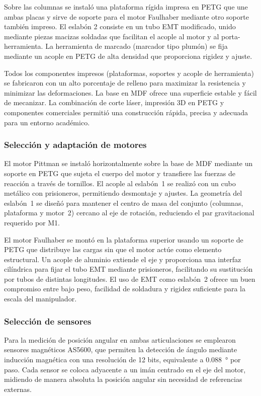 \documentclass[11pt,a4paper]{article}
\begin{document}
Sobre las columnas se instaló una plataforma rígida impresa en PETG que une ambas placas y sirve de soporte para el motor Faulhaber mediante otro soporte también impreso. El eslabón 2 consiste en un tubo EMT modificado, unido mediante piezas macizas soldadas que facilitan el acople al motor y al porta-herramienta. La herramienta de marcado (marcador tipo plumón) se fija mediante un acople en PETG de alta densidad que proporciona rigidez y ajuste.

Todos los componentes impresos (plataformas, soportes y acople de herramienta) se fabricaron con un alto porcentaje de relleno para maximizar la resistencia y minimizar las deformaciones. La base en MDF ofrece una superficie estable y fácil de mecanizar. La combinación de corte láser, impresión 3D en PETG y componentes comerciales permitió una construcción rápida, precisa y adecuada para un entorno académico.


\subsubsection{Selección y adaptación de motores}

El motor Pittman se instaló horizontalmente sobre la base de MDF mediante un soporte en PETG que sujeta el cuerpo del motor y transfiere las fuerzas de reacción a través de tornillos. El acople al eslabón~1 se realizó con un cubo metálico con prisioneros, permitiendo desmontaje y ajustes. La geometría del eslabón~1 se diseñó para mantener el centro de masa del conjunto (columnas, plataforma y motor~2) cercano al eje de rotación, reduciendo el par gravitacional requerido por M1.

El motor Faulhaber se montó en la plataforma superior usando un soporte de PETG que distribuye las cargas sin que el motor actúe como elemento estructural. Un acople de aluminio extiende el eje y proporciona una interfaz cilíndrica para fijar el tubo EMT mediante prisioneros, facilitando su sustitución por tubos de distintas longitudes. El uso de EMT como eslabón~2 ofrece un buen compromiso entre bajo peso, facilidad de soldadura y rigidez suficiente para la escala del manipulador.


\subsubsection{Selección de sensores}

Para la medición de posición angular en ambas articulaciones se emplearon sensores magnéticos AS5600, que permiten la detección de ángulo mediante inducción magnética con una resolución de 12 bits, equivalente a \SI{0.088}{\degree} por paso. Cada sensor se coloca adyacente a un imán centrado en el eje del motor, midiendo de manera absoluta la posición angular sin necesidad de referencias externas.
\end{document}
